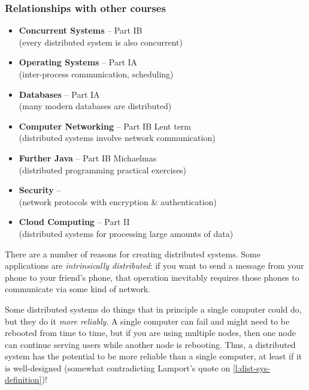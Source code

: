 \begin{frame}
    \label{s:other-courses}
    \frametitle{Relationships with other courses}
    \begin{itemize}
        \item \textbf{Concurrent Systems} -- Part IB\\
            (every distributed system is also concurrent)
        \item \textbf{Operating Systems} -- Part IA\\
            (inter-process communication, scheduling)
        \item \textbf{Databases} -- Part IA\\
            (many modern databases are distributed)
        \item \textbf{Computer Networking} -- Part IB Lent term\\
            (distributed systems involve network communication)
        \item \textbf{Further Java} -- Part IB Michaelmas\\
            (distributed programming practical exercises)
        \item \textbf{Security} -- \whenissecurity\\
            (network protocols with encryption \& authentication)
        \item \textbf{Cloud Computing} -- Part II\\
            (distributed systems for processing large amounts of data)
    \end{itemize}
\end{frame}
\label{l:other-courses}


There are a number of reasons for creating distributed systems.
Some applications are \emph{intrinsically distributed}: if you want to send a message from your phone to your friend's phone, that operation inevitably requires those phones to communicate via some kind of network.

Some distributed systems do things that in principle a single computer could do, but they do it \emph{more reliably}.
A single computer can fail and might need to be rebooted from time to time, but if you are using multiple nodes, then one node can continue serving users while another node is rebooting.
Thus, a distributed system has the potential to be more reliable than a single computer, at least if it is well-designed (somewhat contradicting Lamport's quote on \autoref{l:dist-sys-definition})!

